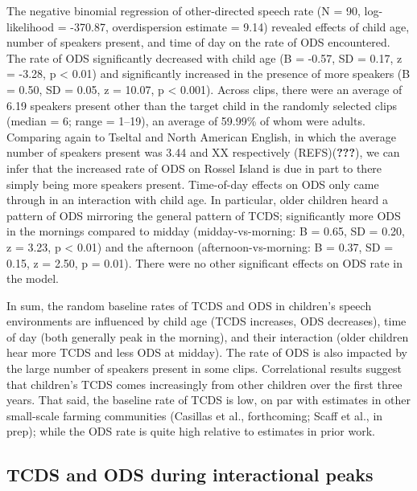 \documentclass[,man,floatsintext]{apa6}
\begin{document}
The negative binomial regression of other-directed speech rate (N = 90,
log-likelihood = -370.87, overdispersion estimate = 9.14) revealed
effects of child age, number of speakers present, and time of day on the
rate of ODS encountered. The rate of ODS significantly decreased with
child age (B = -0.57, SD = 0.17, z = -3.28, p \textless{} 0.01) and
significantly increased in the presence of more speakers (B = 0.50, SD =
0.05, z = 10.07, p \textless{} 0.001). Across clips, there were an
average of 6.19 speakers present other than the target child in the
randomly selected clips (median = 6; range = 1--19), an average of
59.99\% of whom were adults. Comparing again to Tseltal and North
American English, in which the average number of speakers present was
3.44 and XX respectively (REFS)({\textbf{???}}), we can infer that the
increased rate of ODS on Rossel Island is due in part to there simply
being more speakers present. Time-of-day effects on ODS only came
through in an interaction with child age. In particular, older children
heard a pattern of ODS mirroring the general pattern of TCDS;
significantly more ODS in the mornings compared to midday
(midday-vs-morning: B = 0.65, SD = 0.20, z = 3.23, p \textless{} 0.01)
and the afternoon (afternoon-vs-morning: B = 0.37, SD = 0.15, z = 2.50,
p = 0.01). There were no other significant effects on ODS rate in the
model.

In sum, the random baseline rates of TCDS and ODS in children's speech
environments are influenced by child age (TCDS increases, ODS
decreases), time of day (both generally peak in the morning), and their
interaction (older children hear more TCDS and less ODS at midday). The
rate of ODS is also impacted by the large number of speakers present in
some clips. Correlational results suggest that children's TCDS comes
increasingly from other children over the first three years. That said,
the baseline rate of TCDS is low, on par with estimates in other
small-scale farming communities (Casillas et al., forthcoming; Scaff et
al., in prep); while the ODS rate is quite high relative to estimates in
prior work.

\subsection{TCDS and ODS during interactional
peaks}\label{tcds-and-ods-during-interactional-peaks}
\end{document}
